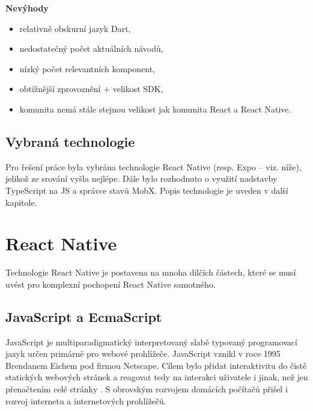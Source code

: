 \textbf{Nevýhody}
\begin{itemize}
	\item relativně obskurní jazyk Dart,
	\item nedostatečný počet aktuálních návodů,
	\item nízký počet relevantních komponent,
	\item obtížnější zprovoznění + velikost SDK,
	\item komunita nemá stále stejnou velikost jak komunita React a React Native.
\end{itemize}

\subsection{Vybraná technologie}

Pro řešení práce byla vybrána technologie React Native (resp. Expo -- viz. níže), jelikož ze srování vyšla nejlépe. Dále bylo rozhodnuto o využití nadstavby TypeScript na JS a správce stavů MobX. Popis technologie je uveden v další kapitole.

\section{React Native}

Technologie React Native je postavena na mnoha dílčích částech, které se musí uvést pro komplexní pochopení React Native samotného.

\subsection{JavaScript a EcmaScript}


JavaScript je multiparadigmatický interpretovaný slabě typovaný programovací jazyk určen primárně pro webové prohlížeče. JavaScript vznikl v roce 1995 Brendanem Eichem pod firmou Netscape. Cílem bylo přidat interaktivitu do čistě statických webových stránek a reagovat tedy na interakci uživatele i jinak, než jen přenačtením celé stránky \cite{Hamilton2008}. S obrovským rozvojem domácích počítačů přišel i rozvoj internetu a internetových prohlížečů.

